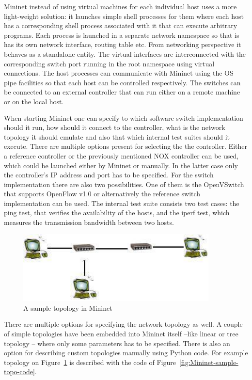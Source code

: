 \documentclass{article}
\begin{document}
Mininet instead of using virtual machines for each individual host uses a more light-weight solution: it launches simple shell processes for them where each host has a corresponding shell process associated with it that can execute arbitrary programs. Each process is launched in a separate network namespace so that is has its own network interface, routing table etc. From networking perspective it behaves as a standalone entity. The virtual interfaces are interconnected with the corresponding switch port running in the root namespace using virtual connections. The host processes can communicate with Mininet using the OS pipe facilities so that each host can be controlled respectively. The switches can be connected to an external controller that can run either on a remote machine or on the local host.

When starting Mininet one can specify to which software switch implementation should it run, how should it connect to the controller, what is the network topology it should emulate and also that which internal test suites should it execute.
There are multiple options present for selecting the the controller. Either a reference controller or the previously mentioned NOX controller can be used, which could be launched either by Mininet or manually. In the latter case only the controller's IP address and port has to be specified. For the switch implementation there are also two possibilities. One of them is the OpenVSwitch that supports OpenFlow v1.0 or alternatively the reference switch implementation can be used. The internal test suite consists two test cases: the ping test, that verifies the availability of the hosts, and the iperf test, which measures the transmission bandwidth between two hosts. 

\begin{figure}[H]%
    \centering
    \includegraphics[width=0.9\textwidth]{figures/mininet-topology.jpg}
    \caption{A sample topology in Mininet}
    \label{fig:Mininet-sample-topo}
\end{figure}

There are multiple options for specifying the network topology as well. A couple of simple topologies have been embedded into Mininet itself --like linear or tree topology -- where only some parameters has to be specified.
There is also an option for describing custom topologies manually using Python code. For example topology on Figure~\ref{fig:Mininet-sample-topo} is described with the code of Figure~\ref{fig:Mininet-sample-topo-code}.
\end{document}
